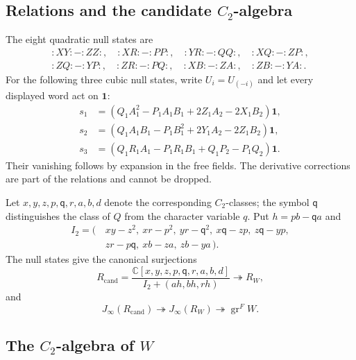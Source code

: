 \documentclass[11pt]{amsart}
\theoremstyle{definition}
\theoremstyle{remark}
\newcommand{\C}{\mathbb C}
\newcommand{\vac}{\mathbf1}
\newcommand{\J}{J_\infty}
\DeclareMathOperator{\gr}{gr}
\begin{document}
\subsection{Relations and the candidate $C_2$-algebra}
The eight quadratic null states are
\begin{equation}\label{eq:C3-quadratic-relations}
\begin{gathered}
 :XY:-:ZZ:,\quad :XR:-:PP:,\quad :YR:-:QQ:,\quad
 :XQ:-:ZP:,\\
 :ZQ:-:YP:,\quad :ZR:-:PQ:,\quad :XB:-:ZA:,\quad :ZB:-:YA:.
\end{gathered}
\end{equation}
For the following three cubic null states, write $U_i=U_{(-i)}$ and let
every displayed word act on $\vac$:
\begin{align}
 s_1&=(Q_1A_1^2-P_1A_1B_1+2Z_1A_2-2X_1B_2)\vac,
 \label{eq:C3-cubic-one}\\
 s_2&=(Q_1A_1B_1-P_1B_1^2+2Y_1A_2-2Z_1B_2)\vac,
 \label{eq:C3-cubic-two}\\
 s_3&=(Q_1R_1A_1-P_1R_1B_1+Q_1P_2-P_1Q_2)\vac.
 \label{eq:C3-cubic-three}
\end{align}
Their vanishing follows by expansion in the free fields. The derivative corrections
are part of the relations and cannot be dropped.

Let $x,y,z,p,\mathsf q,r,a,b,d$ denote the corresponding $C_2$-classes;
the symbol $\mathsf q$ distinguishes the class of $Q$ from the character
variable $q$. Put $h=pb-\mathsf q a$ and
\[
\begin{split}
 I_2=(\,&xy-z^2,\ xr-p^2,\ yr-\mathsf q^2,\ x\mathsf q-zp,\
 z\mathsf q-yp,\\
 &zr-p\mathsf q,\ xb-za,\ zb-ya\,).
\end{split}
\]
The null states give the canonical surjections
\begin{equation}\label{eq:C3-candidate-surjection}
 R_{\mathrm{cand}}=
 \frac{\C[x,y,z,p,\mathsf q,r,a,b,d]}{I_2+(ah,bh,rh)}
 \twoheadrightarrow R_W,
\end{equation}
and
\begin{equation}\label{eq:C3-arc-upper-bound}
 \J(R_{\mathrm{cand}})\twoheadrightarrow\J(R_W)
 \twoheadrightarrow\gr^F W.
\end{equation}

\subsection{The $C_2$-algebra of $W$}
\end{document}
